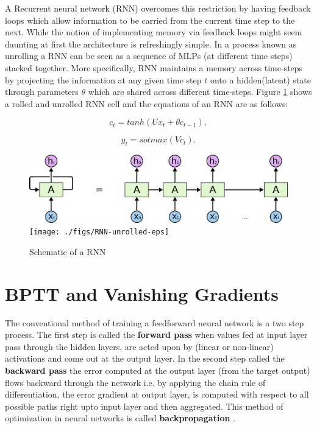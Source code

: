A Recurrent neural network (RNN) \citep{Hopfield1982}\citep{Elman1990} overcomes this restriction by having feedback loops which allow information to be carried from the current time step to the next. While the notion of implementing memory via feedback loops might seem daunting at first the architecture is refreshingly simple. In a process known as unrolling a RNN can be seen as a sequence of MLPs (at different time steps) stacked together. More specifically, RNN maintains a memory across time-steps by projecting the information at any given time step $t$ onto a hidden(latent) state through parameters $\theta$ which are shared across different time-steps. Figure \ref{bck:rnn} shows a rolled and unrolled RNN cell and the equations of an RNN are as follows:

\begin{equation}\label{nn-dynam}
c_t = tanh(Ux_t + \theta c_{t-1}),
\end{equation}

\begin{equation}
y_t = sotmax(Vc_t).
\end{equation}

\begin{figure}
	\begin{minipage}[t]{\textwidth}
		\ifpdf
		\includegraphics[width=\linewidth,keepaspectratio=true]{./figs/RNN-unrolled-pdf}
		\else
		\texttt{[image: ./figs/RNN-unrolled-eps]}
		\fi
		\caption{\small Schematic of a RNN \cite{olah}}
		\label{bck:rnn}
	\end{minipage}
\end{figure}

\section{BPTT and Vanishing Gradients}
The conventional method of training a feedforward neural network is a two step process. The first step is called the \textbf{forward pass} when values fed at input layer pass through the hidden layers, are acted upon by (linear or non-linear) activations and come out at the output layer. In the second step called the \textbf{backward pass}  the error computed at the output layer (from the target output) flows backward through the network i.e. by applying the chain rule of differentiation, the error gradient at output layer, is computed with respect to all possible paths right upto input layer and then aggregated. This method of optimization in neural networks is called \textbf{backpropagation} \citep{Rumelhart1986}.


